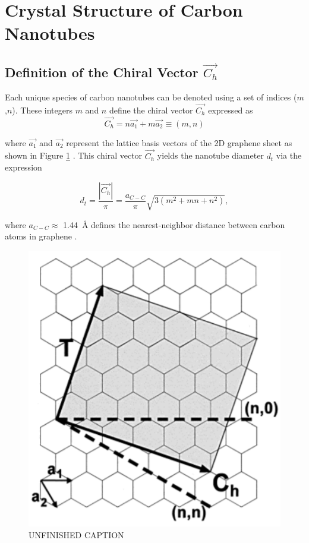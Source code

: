 \section{Crystal Structure of Carbon Nanotubes}

\subsection{Definition of the Chiral Vector $\vec{C_h}$}

Each unique species of carbon nanotubes can be	 denoted using a set of indices ($m$,$n$). These integers $m$ and $n$ define the chiral vector $\vec{C_h }$ expressed as 
\begin{equation}
	\vec{C_h} = n {\vec{a_1}} + m {\vec{a_2}} \equiv (m,n)
\end{equation}

where $\vec{a_1}$ and $\vec{a_2}$ represent the lattice basis vectors of the 2D graphene sheet as shown in Figure \ref{fig:chiral_vectors} \cite{nanot2013single}. This chiral vector $\vec{C_h}$ yields the nanotube diameter $d_t$ via the expression

\begin{equation}
	d_t = \dfrac{|\vec{C_h}|}{\pi} = \dfrac{a_{C-C}}{\pi}\sqrt{3(m^2 + mn + n^2)},
\end{equation} 

where $a_{C-C} \approx$ \SI{1.44}{\angstrom} defines the nearest-neighbor distance between carbon atoms in graphene \cite{nanot2013single}.  

\begin{figure}[ht]
	\centering
	\includegraphics[scale=1]{images/chapter_optical_props/chiral_vectors_sheet.png}
	\caption{{\color{red}UNFINISHED CAPTION}}
	\label{fig:chiral_vectors}
\end{figure}

